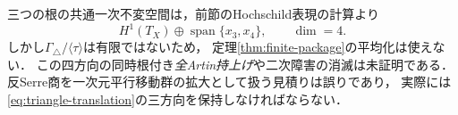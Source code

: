 \begin{remark}[固定空間と高次の未解決性]
三つの根の共通一次不変空間は，前節のHochschild表現の計算より
\[
 H^1(T_X)\oplus\operatorname{span}\{x_3,x_4\},\qquad\dim=4.
\]
しかし$\Gamma_\triangle/\langle\tau\rangle$は有限ではないため，
定理\ref{thm:finite-package}の平均化は使えない．
この四方向の同時根付き\emph{全Artin持上げ}や二次障害の消滅は未証明である．
反Serre商を一次元平行移動群の拡大として扱う見積りは誤りであり，
実際には\eqref{eq:triangle-translation}の三方向を保持しなければならない．
\end{remark}
